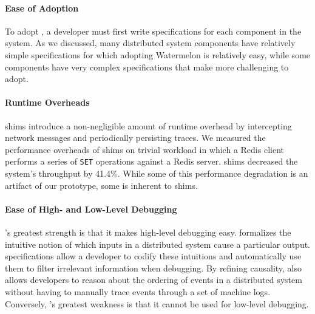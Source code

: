 \paragraph{Ease of Adoption}
To adopt \fluent{}, a developer must first write \watprovenance{}
specifications for each component in the system. As we discussed, many
distributed system components have relatively simple \watprovenance{}
specifications for which adopting Watermelon is relatively easy, while some
components have very complex \watprovenance{} specifications that make
\fluent{} more challenging to adopt.

\paragraph{Runtime Overheads}
\fluent{} shims introduce a non-negligible amount of runtime overhead by
intercepting network messages and periodically persisting traces. We measured
the performance overheads of \fluent{} shims on trivial workload in which a
Redis client performs a series of \texttt{SET} operations against a Redis
server. \fluent{} shims decreased the system's throughput by 41.4\%. While some
of this performance degradation is an artifact of our prototype, some is
inherent to shims.

\paragraph{Ease of High- and Low-Level Debugging}
\fluent{}'s greatest strength is that it makes high-level debugging easy.
\Watprovenance{} formalizes the intuitive notion of which inputs in a
distributed system cause a particular output. \Watprovenance{} specifications
allow a developer to codify these intuitions and automatically use them to
filter irrelevant information when debugging. By refining causality,
\watprovenance{} also allows developers to reason about the ordering of events
in a distributed system without having to manually trace events through a set
of machine logs. Conversely, \fluent{}'s greatest weakness is that it cannot be
used for low-level debugging.
